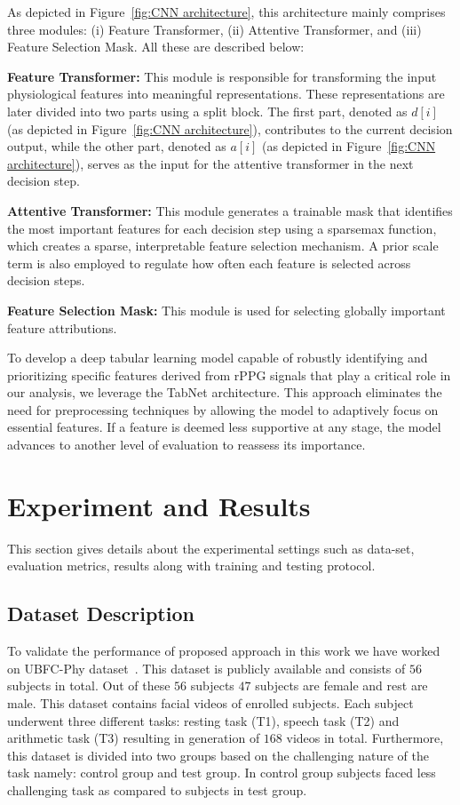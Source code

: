 As depicted in Figure~\ref{fig:CNN architecture}, this architecture mainly comprises three modules: (i) Feature Transformer, (ii) Attentive Transformer, and (iii) Feature Selection Mask. All these are described below:

\textbf{Feature Transformer:} This module is responsible for transforming the input physiological features into meaningful representations. These representations are later divided into two parts using a split block. The first part, denoted as \(d[i]\) (as depicted in Figure~\ref{fig:CNN architecture}), contributes to the current decision output, while the other part, denoted as \(a[i]\) (as depicted in Figure~\ref{fig:CNN architecture}), serves as the input for the attentive transformer in the next decision step.

\textbf{Attentive Transformer:} This module generates a trainable mask that identifies the most important features for each decision step using a sparsemax function, which creates a sparse, interpretable feature selection mechanism. A prior scale term is also employed to regulate how often each feature is selected across decision steps.

\textbf{Feature Selection Mask:} This module is used for selecting globally important feature attributions.

To develop a deep tabular learning model capable of robustly identifying and prioritizing specific features derived from rPPG signals that play a critical role in our analysis, we leverage the TabNet architecture. This approach eliminates the need for preprocessing techniques by allowing the model to adaptively focus on essential features. If a feature is deemed less supportive at any stage, the model advances to another level of evaluation to reassess its importance.


\section{Experiment and Results} This section gives details about the experimental settings such as data-set, evaluation metrics, results along with training and testing protocol.

\subsection{Dataset Description} To validate the performance of proposed approach  in this work we have worked on UBFC-Phy dataset~\cite{sabour2021ubfc}. This dataset is publicly available and consists of $56$ subjects in total. Out of these $56$ subjects $47$ subjects are female and rest are male. This dataset contains facial videos of enrolled subjects. Each subject underwent  three different tasks: resting task (T1), speech task (T2) and arithmetic task (T3) resulting in generation of $168$ videos in total. Furthermore, this dataset is divided into two groups based on the challenging nature of the task namely: control group and test group. In control group subjects faced less challenging task as compared to subjects in test group.
